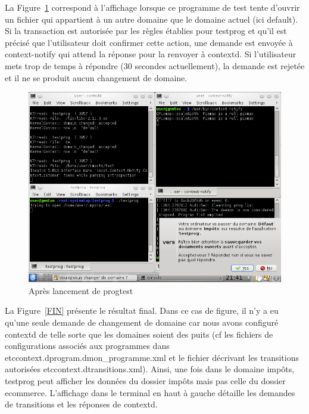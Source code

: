 \documentclass[pdftex,a4paper,titlepage,11pt]{article}
\begin{document}
La Figure~\ref{DEMANDE} correspond à l'affichage lorsque ce programme de test tente d'ouvrir un fichier qui appartient à un autre domaine que le domaine actuel (ici default). Si la transaction est autorisée par les règles établies pour testprog et qu'il est précisé que l'utilisateur doit confirmer cette action, une demande est envoyée à context-notify qui attend la réponse pour la renvoyer à contextd. Si l'utilisateur mets trop de temps à répondre (30 secondes actuellement), la demande est rejetée et il ne se produit aucun changement de domaine.

\begin{figure}%
	\centering
	\includegraphics[scale=0.5]{attachements/capture_notify.png}
	\caption{Après lancement de progtest}
	\label{DEMANDE}
\end{figure}

La Figure~\ref{FIN} présente le résultat final. Dans ce cas de figure, il n'y a eu qu'une seule demande de changement de domaine car nous avons configuré contextd de telle sorte que les domaines soient des puits (cf les fichiers de configurations associés aux programmes dans \/etc\/context.d\/program.d\/mon\_programme.xml et le fichier décrivant les transitions autorisées \/etc\/context.d\/transitions.xml). Ainsi, une fois dans le domaine impôts, testprog peut afficher les données du dossier impôts mais pas celle du dossier ecommerce. L'affichage dans le terminal en haut à gauche détaille les demandes de transitions et les réponses de contextd.
\end{document}
